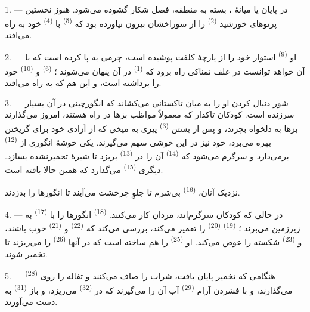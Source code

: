 1. --- در پایان  یا میانهٔ ، بسته به
منطقه، فصل شکار گشوده می‌شود. هنوز نخستین پرتوهای خورشید
 \textsuperscript{(2)} را از سوراخشان بیرون نیاورده
بود که  \textsuperscript{(5)} با 
\textsuperscript{(4)} خود به راه می‌افتد.

2. --- او  \textsuperscript{(9)} استوار خود را از
پارچهٔ کلفت پوشیده است،  چرمی به پا کرده است که با آن
خواهد توانست در علف نمناکی راه برود که 
\textsuperscript{(1)} در آن پنهان می‌شوند ؛ 
\textsuperscript{(6)} و  \textsuperscript{(10)} خود را
برداشته است، و این هم که به راه می‌افتد.

3. --- شور دنبال کردن او را به میان تاکستانی می‌کشاند که انگورچینی در
آن بسیار سرزنده است. کودکان تاکدار که معمولاً مواظب بزها در راه هستند،
امروز می‌گذارند بزها به دلخواه بچرند، و پس از بستن 
\textsuperscript{(3)} پیری به میخی که از آزادی خود برای گریختن بهره
می‌برد، خود نیز در این خوشی سهم می‌گیرند. یکی خوشهٔ انگوری از
 \textsuperscript{(12)} برمی‌دارد و سرگرم می‌شود
که  \textsuperscript{(14)} آن را در 
\textsuperscript{(13)} بریزد تا شیرهٔ تخمیرنشده بسازد. دیگری
 \textsuperscript{(15)} می‌گذارد که همین حالا بافته
است.

نزدیک آنان،  \textsuperscript{(16)} بی‌شرم تا جلوِ
چرخشت می‌آیند تا انگورها را بدزدند.

4. --- در حالی که کودکان سرگرم‌اند، مردان کار می‌کنند.
 \textsuperscript{(18)} انگورها را با  \textsuperscript{(17)} به زیرزمین می‌برند ؛ 
\textsuperscript{(19)}  \textsuperscript{(20)} را
تعمیر می‌کند، بررسی می‌کند که 
\textsuperscript{(22)} و  \textsuperscript{(21)} خوب
باشند، و  \textsuperscript{(23)} شکسته را عوض می‌کند.
او  \textsuperscript{(25)} را هم ساخته است که در
آنها  \textsuperscript{(26)} را می‌ریزند تا تخمیر
شوند.

5. --- هنگامی که تخمیر پایان یافت، شراب را صاف می‌کنند و تفاله را روی
 \textsuperscript{(28)} می‌گذارند، و با فشردن آرام
 \textsuperscript{(29)} آب آن را می‌گیرند که در
 \textsuperscript{(32)} می‌ریزد، و باز 
\textsuperscript{(31)} به دست می‌آورند.

